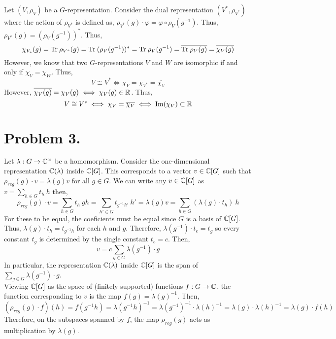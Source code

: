 \documentclass[12pt]{extarticle}
\begin{document}
Let $(V, \rho_V)$ be a $G$-representation. Consider the dual representation $(V^*, \rho_{V^*})$ where the action of $\rho_{V^*}$ is defined as, $\rho_{V^*}(g) \cdot \varphi = \varphi \circ \rho_{V}(g^{-1})$. Thus, $\rho_{V^*}(g) = (\rho_{V}(g^{-1}))^*$. Thus, 
\[\chi_{V_*}(g) = \mathrm{Tr} \: \rho_{V^*}(g) = \mathrm{Tr} \: (\rho_{V}(g^{-1}))^* = \mathrm{Tr} \: \rho_{V}(g^{-1}) = \overline{\mathrm{Tr} \: \rho_{V}(g)} = \overline{\chi_V(g)}\]
However, we know that two $G$-representations $V$ and $W$ are isomorphic if and only if $\chi_V = \chi_W$. Thus, 
\[ V \cong V^* \iff \chi_V = \chi_{V^*} = \overline{\chi_V}\]
However, $\overline{\chi_V(g)} = \chi_V(g) \iff \chi_V(g) \in \mathbb{R}$. Thus,
\[ V \cong V^* \iff \chi_V = \overline{\chi_V} \iff \mathrm{Im}(\chi_V) \subset \mathbb{R} \]

\section*{Problem 3.}

Let $\lambda : G \to \mathbb{C}^\times$ be a homomorphism. Consider the one-dimensional representation $\mathbb{C}(\lambda)$ inside $\mathbb{C}[G]$. This corresponds to a vector $v \in \mathbb{C}[G]$ such that $\rho_{reg}(g) \cdot v = \lambda(g) v$ for all $g \in G$. We can write any $v \in \mathbb{C}[G]$ as $v = \sum\limits_{h \in G} t_h \: h$ then,
\[\rho_{reg}(g) \cdot v = \sum\limits_{h \in G} t_h \: gh = \sum\limits_{h' \in G} t_{g^{-1}h'} \: h' = \lambda(g) v = \sum\limits_{h \in G} ( \lambda (g) \cdot  t_h ) \: h \]
For these to be equal, the coeficients must be equal since $G$ is a basis of $\mathbb{C}[G]$. Thus, $\lambda(g) \cdot t_h = t_{g^{-1}h}$ for each $h$ and $g$. Therefore, $\lambda(g^{-1}) \cdot t_{e} = t_{g}$ so every constant $t_g$ is determined by the single constant $t_{e} = c$. Then,
\[ v = c \sum_{g \in G} \lambda(g^{-1}) \cdot g \]
In particular, the representation $\mathbb{C}(\lambda)$ inside $\mathbb{C}[G]$ is the span of $\sum\limits_{g \in G} \lambda(g^{-1}) \cdot g$. \bigskip\\
Viewing $\mathbb{C}[G]$ as the space of (finitely supported) functions $f : G \to \mathbb{C}$, the function corresponding to $v$ is the map $f(g) = \lambda(g)^{-1}$. Then, 
\[(\rho_{reg}(g) \cdot f)(h) = f(g^{-1}h) = \lambda(g^{-1} h)^{-1} = \lambda(g^{-1})^{-1} \cdot \lambda(h)^{-1} = \lambda(g) \cdot \lambda(h)^{-1} = \lambda(g) \cdot f(h)\]
Therefore, on the subspaces spanned by $f$, the map $\rho_{reg}(g)$ acts as multiplication by $\lambda(g)$. 
  
\end{document}
